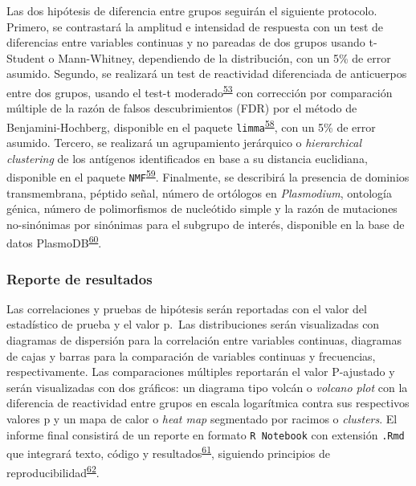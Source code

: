 \documentclass[a4paper]{article}
\begin{document}
Las dos hipótesis de diferencia entre grupos seguirán el siguiente
protocolo. Primero, se contrastará la amplitud e intensidad de respuesta
con un test de diferencias entre variables continuas y no pareadas de
dos grupos usando t-Student o Mann-Whitney, dependiendo de la
distribución, con un 5\% de error asumido. Segundo, se realizará un test
de reactividad diferenciada de anticuerpos entre dos grupos, usando el
test-t
moderado\textsuperscript{\protect\hyperlink{ref-smyth2004ebayes}{53}}
con corrección por comparación múltiple de la razón de falsos
descubrimientos (FDR) por el método de Benjamini-Hochberg, disponible en
el paquete
\texttt{limma}\textsuperscript{\protect\hyperlink{ref-limma}{58}}, con
un 5\% de error asumido. Tercero, se realizará un agrupamiento
jerárquico o \emph{hierarchical clustering} de los antígenos
identificados en base a su distancia euclidiana, disponible en el
paquete
\texttt{NMF}\textsuperscript{\protect\hyperlink{ref-Gaujoux2010NMF}{59}}.
Finalmente, se describirá la presencia de dominios transmembrana,
péptido señal, número de ortólogos en \emph{Plasmodium}, ontología
génica, número de polimorfismos de nucleótido simple y la razón de
mutaciones no-sinónimas por sinónimas para el subgrupo de interés,
disponible en la base de datos
PlasmoDB\textsuperscript{\protect\hyperlink{ref-plasmodb}{60}}.

\subsubsection{Reporte de resultados}\label{reporte-de-resultados}

Las correlaciones y pruebas de hipótesis serán reportadas con el valor
del estadístico de prueba y el valor p.~Las distribuciones serán
visualizadas con diagramas de dispersión para la correlación entre
variables continuas, diagramas de cajas y barras para la comparación de
variables continuas y frecuencias, respectivamente. Las comparaciones
múltiples reportarán el valor P-ajustado y serán visualizadas con dos
gráficos: un diagrama tipo volcán o \emph{volcano plot} con la
diferencia de reactividad entre grupos en escala logarítmica contra sus
respectivos valores p y un mapa de calor o \emph{heat map} segmentado
por racimos o \emph{clusters}. El informe final consistirá de un reporte
en formato \texttt{R\ Notebook} con extensión \texttt{.Rmd} que
integrará texto, código y
resultados\textsuperscript{\protect\hyperlink{ref-knitr}{61}}, siguiendo
principios de
reproducibilidad\textsuperscript{\protect\hyperlink{ref-CienciaReproducible2016}{62}}.
\end{document}

